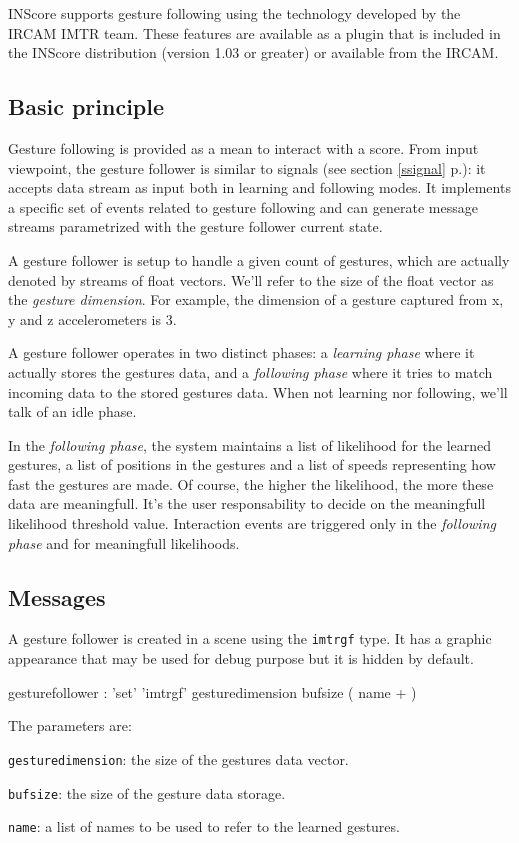 \documentclass[a4paper,twoside]{report}
\newcommand{\subsublevel}[1]	{\subsection{#1}}
\newcommand{\fullref}[1]	{\ref{#1} p.\pageref{#1}}
\newcommand{\OSC}[1]		{\texttt{#1}}
\let\olditemize\itemize
\let\oldenditemize\enditemize
\renewenvironment{itemize} 	{\olditemize \setlength{\itemsep}{1mm}}{\oldenditemize}
\begin{document}
INScore supports gesture following using the technology developed by the IRCAM IMTR team. These features are available as a plugin that is included in the INScore distribution (version 1.03 or greater) or available from the IRCAM.

\subsublevel{Basic principle}\label{gfbasic}
Gesture following is provided as a mean to interact with a score. From input viewpoint, the gesture follower is similar to signals (see section \fullref{ssignal}): it accepts data stream as input both in learning and following modes. It implements a specific set of events related to gesture following and can generate message streams parametrized with the gesture follower current state.

A gesture follower is setup to handle a given count of gestures, which are actually denoted by streams of float vectors. We'll refer to the size of the float vector as the \emph{gesture dimension}. For example, the dimension of a gesture captured from x, y and z accelerometers is 3.

A gesture follower operates in two distinct phases: a \emph{learning phase} where it actually stores the gestures data, and a \emph{following phase} where it tries to match incoming data to the stored gestures data. When not learning nor following, we'll talk of an idle phase. 

In the \emph{following phase}, the system maintains a list of likelihood for the learned gestures, a list of positions in the gestures and a list of speeds representing how fast the gestures are made. Of course, the higher the likelihood, the more these data are meaningfull. It's the user responsability to decide on the meaningfull likelihood threshold value. Interaction events are triggered only in the \emph{following phase} and for meaningfull likelihoods.

\subsublevel{Messages}\label{gfmessages}
A gesture follower is created in a scene using the \OSC{imtrgf} type. It has a graphic appearance that may be used for debug purpose but it is hidden by default.

\begin{rail}
gesturefollower : 'set' 'imtrgf' gesturedimension bufsize ( name + )
\end{rail}

The parameters are:
\begin{itemize}
\item \OSC{gesturedimension}: the size of the gestures data vector.
\item \OSC{bufsize}: the size of the gesture data storage.
\item \OSC{name}: a list of names to be used to refer to the learned gestures.
\end{itemize}
\end{document}
